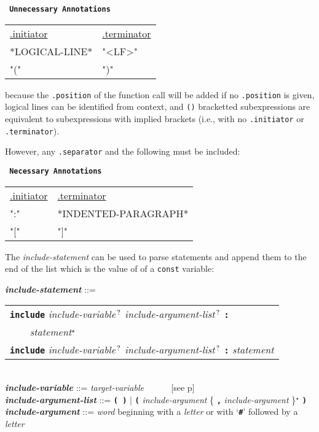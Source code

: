 \documentclass[12pt]{article}
\newcommand{\TT}[1]{{\tt \bfseries #1}}
\newcommand{\STAR}{{\Large $^\star$}}
\newcommand{\QMARK}{{$^{\,\mbox{\footnotesize ?}}$}}
\newcommand{\emkey}[1]{{\em \bfseries #1}}
\newcommand{\pagref}[1]{p\pageref{#1}}
\newenvironment{indpar}[1][0.3in]%
	{\begin{list}{}%
		     {\setlength{\itemsep}{0in}%
		      \setlength{\topsep}{0in}%
		      \setlength{\parsep}{1ex}%
		      \setlength{\labelwidth}{#1}%
		      \setlength{\leftmargin}{#1}%
		      \addtolength{\leftmargin}{\labelsep}}%
	 \item}%
	{\end{list}}
\begin{document}
\begin{center} \tt
{\rm \bf Unnecessary Annotations}\label{UNNECESSARY-ANNOTATIONS}
\\[1ex]
\begin{tabular}{l@{~~~~~~~~~~}l}
\underline{.initiator} & \underline{.terminator}
\\[1ex]
*LOGICAL-LINE* & "<LF>" \\
"(" & ")" \\
\end{tabular}
\end{center}

because the {\tt .position} of the function call will be added
if no {\tt .position} is given,
logical lines can be identified from context, and
{\tt ()} bracketted subexpressions are equivalent to
subexpressions with implied brackets (i.e., with no
{\tt .initiator} or {\tt .terminator}).

However, any {\tt .separator} and the following must be included:

\begin{center} \tt
{\rm \bf Necessary Annotations}
\\[1ex]
\begin{tabular}{l@{~~~~~~~~~~}l}
\underline{.initiator} & \underline{.terminator}
\\[1ex]
":" & *INDENTED-PARAGRAPH* \\
"[" & "]" \\
\end{tabular}
\end{center}


The {\em include-statement} can be used to parse statements
and append them to the end of the list which is the value of
of a {\tt const} variable:

\begin{indpar}
\emkey{include-statement}\label{INCLUDE-STATEMENT} ::= \\
\hspace*{0.3in}
    \begin{tabular}[t]{l}
    \TT{include} {\em include-variable}\QMARK{}
    	{\em include-argument-list}\QMARK{} \TT{:} \\
    \TT{~~~~}{\em statement}\STAR{} \\
    \TT{include}  {\em include-variable}\QMARK{}
    	{\em include-argument-list}\QMARK{} \TT{:}
	{\em statement} \\
    \end{tabular}
\\[0.5ex]
\emkey{include-variable} ::= {\em target-variable}
	~~~~~ [see \pagref{TARGET-VARIABLE}]
\\[0.5ex]
\emkey{include-argument-list} ::= \TT{( )} $|$
	\TT{(} {\em include-argument}
	\{ \TT{,} {\em include-argument} \}\STAR{} \TT{)}
\\[0.5ex]
\emkey{include-argument} ::= {\em word} beginning with a {\em letter} or
	with `\TT{\#}' followed by a {\em letter}

\end{indpar}
\end{document}
